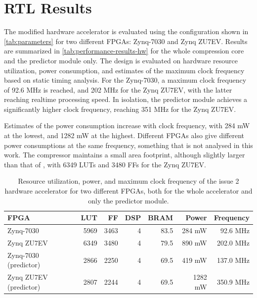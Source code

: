 \section{RTL Results}

The modified hardware accelerator is evaluated using the configuration shown in \autoref{tab:parameters} for two different \acrshort{FPGA}s: Zynq-7030 and Zynq ZU7EV. Results are summarized in \autoref{tab:performance-results-hw} for the whole compression core and the predictor module only. The design is evaluated on hardware resource utilization, power consumption, and estimates of the maximum clock frequency based on static timing analysis. For the Zynq-7030, a maximum clock frequency of 92.6 MHz is reached, and 202 MHz for the Zynq ZU7EV, with the latter reaching realtime processing speed. In isolation, the predictor module achieves a significantly higher clock frequency, reaching 351 MHz for the Zynq ZU7EV.

Estimates of the power consumption increase with clock frequency, with 284 mW at the lowest, and 1282 mW at the highest. Different \acrshort{FPGA}s also give different power consumptions at the same frequency, something that is not analysed in this work. The compressor maintains a small area footprint, although slightly larger than that of \citeauthor{vorhaugHyperspectralImageCompression2024}, with 6349 \acrshort{LUT}s and 3480 \acrshort{FF}s for the Zynq ZU7EV.

\begin{table}[ht]
	\caption{Resource utilization, power, and maximum clock frequency of the issue 2 hardware accelerator for two different FPGAs, both for the whole accelerator and only the predictor module.}
	\label{tab:performance-results-hw}
	\begin{center}
		\begin{tabular}{lrrrrrr}
			\hline
			\textbf{FPGA}          & \textbf{LUT} & \textbf{FF} & \textbf{DSP} & \textbf{BRAM} & \textbf{Power} & \textbf{Frequency} \\
			\hline
			Zynq-7030              & 5969         & 3463        & 4            & 83.5          & 284 mW         & 92.6 MHz           \\
			Zynq ZU7EV             & 6349         & 3480        & 4            & 79.5          & 890 mW         & 202.0 MHz          \\
			Zynq-7030 (predictor)  & 2866         & 2250        & 4            & 69.5          & 419 mW         & 137.0 MHz          \\
			Zynq ZU7EV (predictor) & 2807         & 2244        & 4            & 69.5          & 1282 mW        & 350.9 MHz          \\
			\hline
		\end{tabular}
	\end{center}
\end{table}

